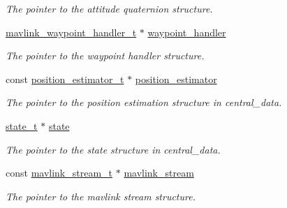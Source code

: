\begin{DoxyCompactItemize}
\begin{DoxyCompactList}\small\item\em The pointer to the attitude quaternion structure. \end{DoxyCompactList}\item 
\hypertarget{structnavigation__t_a6ccfcf0b45aca7481158290017040279}{\hyperlink{structmavlink__waypoint__handler__t}{mavlink\+\_\+waypoint\+\_\+handler\+\_\+t} $\ast$ \hyperlink{structnavigation__t_a6ccfcf0b45aca7481158290017040279}{waypoint\+\_\+handler}}\label{structnavigation__t_a6ccfcf0b45aca7481158290017040279}

\begin{DoxyCompactList}\small\item\em The pointer to the waypoint handler structure. \end{DoxyCompactList}\item 
\hypertarget{structnavigation__t_a68a4e7bc5f187189fff935c6c8f114ab}{const \hyperlink{structposition__estimator__t}{position\+\_\+estimator\+\_\+t} $\ast$ \hyperlink{structnavigation__t_a68a4e7bc5f187189fff935c6c8f114ab}{position\+\_\+estimator}}\label{structnavigation__t_a68a4e7bc5f187189fff935c6c8f114ab}

\begin{DoxyCompactList}\small\item\em The pointer to the position estimation structure in central\+\_\+data. \end{DoxyCompactList}\item 
\hypertarget{structnavigation__t_ac68b927ceede7c514d0e6c8a97a55d83}{\hyperlink{structstate__t}{state\+\_\+t} $\ast$ \hyperlink{structnavigation__t_ac68b927ceede7c514d0e6c8a97a55d83}{state}}\label{structnavigation__t_ac68b927ceede7c514d0e6c8a97a55d83}

\begin{DoxyCompactList}\small\item\em The pointer to the state structure in central\+\_\+data. \end{DoxyCompactList}\item 
\hypertarget{structnavigation__t_a1ee78fc0576cd8e00e61293a613662c4}{const \hyperlink{structmavlink__stream__t}{mavlink\+\_\+stream\+\_\+t} $\ast$ \hyperlink{structnavigation__t_a1ee78fc0576cd8e00e61293a613662c4}{mavlink\+\_\+stream}}\label{structnavigation__t_a1ee78fc0576cd8e00e61293a613662c4}

\begin{DoxyCompactList}\small\item\em The pointer to the mavlink stream structure. \end{DoxyCompactList}\end{DoxyCompactItemize}


